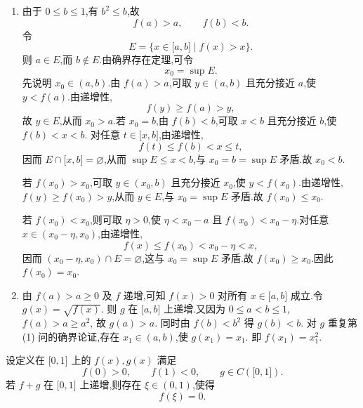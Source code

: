 \begin{solution}
    \leavevmode
    \begin{enumerate}
        \item 由于 $0\leq b\leq1$,有 $b^2\leq b$,故
              \[
                  f(a)>a,
                  \qquad
                  f(b)<b.
              \]
              令
              \[
                  E=\{x\in\lbrack a,b\rbrack\mid f(x)>x\}.
              \]
              则 $a\in E$,而 $b\notin E$.由确界存在定理,可令
              \[
                  x_0=\sup E.
              \]
              先说明 $x_0\in(a,b)$.由 $f(a)>a$,可取 $y\in(a,b)$ 且充分接近 $a$,使 $y<f(a)$.由递增性,
              \[
                  f(y)\geq f(a)>y,
              \]
              故 $y\in E$,从而 $x_0>a$.若 $x_0=b$,由 $f(b)<b$,可取 $x<b$ 且充分接近 $b$,使 $f(b)<x<b$.
              对任意 $t\in\lbrack x,b\rbrack$,由递增性,
              \[
                  f(t)\leq f(b)<x\leq t,
              \]
              因而 $E\cap\lbrack x,b\rbrack=\varnothing$,从而 $\sup E\leq x<b$,与 $x_0=b=\sup E$ 矛盾.故 $x_0<b$.

              若 $f(x_0)>x_0$,可取 $y\in(x_0,b)$ 且充分接近 $x_0$,使 $y<f(x_0)$.由递增性,
              $f(y)\geq f(x_0)>y$,从而 $y\in E$,与 $x_0=\sup E$ 矛盾.故 $f(x_0)\leq x_0$.

              若 $f(x_0)<x_0$,则可取 $\eta>0$,使 $\eta<x_0-a$ 且 $f(x_0)<x_0-\eta$.对任意
              $x\in(x_0-\eta,x_0)$,由递增性,
              \[
                  f(x)\leq f(x_0)<x_0-\eta<x,
              \]
              因而 $(x_0-\eta,x_0)\cap E=\varnothing$,这与 $x_0=\sup E$ 矛盾.故 $f(x_0)\geq x_0$.因此 $f(x_0)=x_0$.

        \item 由 $f(a)>a\geq0$ 及 $f$ 递增,可知 $f(x)>0$ 对所有 $x\in\lbrack a,b\rbrack$ 成立.令
              $g(x)=\sqrt{f(x)}$. 则 $g$ 在 $\lbrack a,b\rbrack$ 上递增.又因为 $0\leq a<b\leq1$, $f(a)>a\geq
                  a^2$, 故 $g(a)>a$. 同时由 $f(b)<b^2$ 得 $g(b)<b$. 对 $g$ 重复第 (1) 问的确界论证,存在 $x_1\in(a,b)$,使
              $g(x_1)=x_1$. 即 $f(x_1)=x_1^2$.
    \end{enumerate}
\end{solution}

\begin{example}
    设定义在 $\lbrack0,1\rbrack$ 上的 $f(x),g(x)$ 满足
    \[
        f(0)>0,
        \qquad
        f(1)<0,
        \qquad
        g\in C(\lbrack0,1\rbrack).
    \]
    若 $f+g$ 在 $\lbrack0,1\rbrack$ 上递增,则存在 $\xi\in(0,1)$,使得
    \[
        f(\xi)=0.
    \]
\end{example}
\exampleblank

